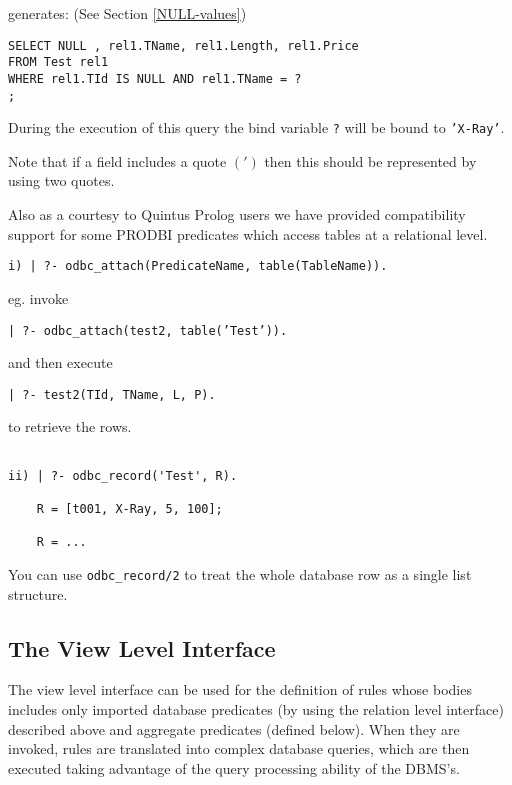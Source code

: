 generates: (See Section \ref{NULL-values})

\begin{verbatim}
SELECT NULL , rel1.TName, rel1.Length, rel1.Price
FROM Test rel1
WHERE rel1.TId IS NULL AND rel1.TName = ?
;
\end{verbatim}

During the execution of this query the bind variable {\tt ?} will be bound
to {\tt 'X-Ray'}.\newline

Note that if a field includes a quote $(')$ then this should be represented by
using two quotes.

Also as a courtesy to Quintus Prolog users we have provided
compatibility support for some PRODBI predicates which access tables
at a relational level.

\begin{verbatim}
i) | ?- odbc_attach(PredicateName, table(TableName)).
\end{verbatim}

eg. invoke 
\begin{center}
{\tt | ?- odbc\_attach(test2, table('Test')).} 
\end{center}
and then execute 
\begin{center}	
{\tt | ?- test2(TId, TName, L, P).}
\end{center}
to retrieve the rows.
\begin{verbatim}

ii) | ?- odbc_record('Test', R).

    R = [t001, X-Ray, 5, 100];

    R = ...

\end{verbatim}
    You can use {\tt odbc\_record/2} to treat the whole database row as a 
single list structure.

\subsection{The View Level Interface}

The view level interface can be used for the definition of rules
whose bodies includes only imported database predicates (by using the
relation level interface) described above and aggregate predicates
(defined below).  When they are invoked, rules are translated into complex
database queries, which are then executed taking advantage of the query
processing ability of the DBMS's.

